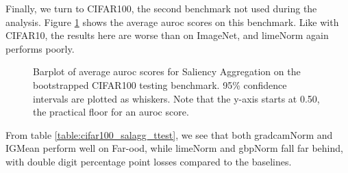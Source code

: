 \documentclass[UKenglish]{uiomasterthesis} %
\theoremstyle{definition}
\begin{document}
Finally, we turn to CIFAR100, the second benchmark not used during the analysis. Figure \ref{fig:cifar100_salagg_bootstrap_barplot} shows the average \ac{auroc} scores on this benchmark. Like with CIFAR10, the results here are worse than on ImageNet, and \ac{lime}Norm again performs poorly.

\begin{figure}[H]
    \begin{center}
        
    \end{center}
    \caption[CIFAR100 Saliency Aggregation Bootstrap]{Barplot of average \ac{auroc} scores for Saliency Aggregation on the bootstrapped CIFAR100 testing benchmark. 95\% confidence intervals are plotted as whiskers. Note that the y-axis starts at 0.50, the practical floor for an \ac{auroc} score.}
    \label{fig:cifar100_salagg_bootstrap_barplot}
\end{figure}

From table \ref{table:cifar100_salagg_ttest}, we see that both \ac{gradcam}Norm and IGMean perform well on Far-\ac{ood}, while \ac{lime}Norm and \ac{gbp}Norm fall far behind, with double digit percentage point losses compared to the baselines.
\end{document}

